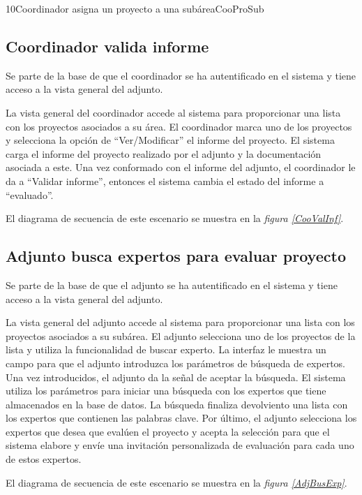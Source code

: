 \documentclass[11pt,a4paper,spanish,twoside]{book}
\begin{document}
{10}{Coordinador asigna un proyecto a una subárea}{CooProSub}

\subsection{Coordinador valida informe}
Se parte de la base de que el coordinador se ha autentificado en el sistema y
tiene acceso a la vista general del adjunto.

La vista general del coordinador accede al sistema para proporcionar una
lista con los proyectos asociados a su área. El coordinador marca uno
de los proyectos y selecciona la opción de ``Ver/Modificar'' el informe del
proyecto. El sistema carga el informe del proyecto realizado por el adjunto
y la documentación asociada a este. Una vez conformado con el informe del
adjunto, el coordinador le da a ``Validar informe'', entonces el sistema
cambia el estado del informe a ``evaluado''.

El diagrama de secuencia de este escenario se muestra en la \emph{figura
\ref{CooValInf}}.


\subsection{Adjunto busca expertos para evaluar proyecto}
Se parte de la base de que el adjunto se ha autentificado en el sistema y
tiene acceso a la vista general del adjunto.

La vista general del adjunto accede al sistema para proporcionar una lista
con los proyectos asociados a su subárea. El adjunto selecciona uno de los
proyectos de la lista y utiliza la funcionalidad de buscar experto. La 
interfaz le muestra un campo para que el adjunto introduzca los parámetros de
búsqueda de expertos. Una vez introducidos, el adjunto da la señal de
aceptar la búsqueda. El sistema utiliza los parámetros para iniciar una 
búsqueda con los expertos que tiene almacenados en la base de datos. La
búsqueda finaliza devolviento una lista con los expertos que contienen las
palabras clave. Por último, el adjunto selecciona los expertos que desea que
evalúen el proyecto y acepta la selección para que el sistema elabore y
envíe una invitación personalizada de evaluación para cada uno de estos
expertos.

El diagrama de secuencia de este escenario se muestra en la \emph{figura
\ref{AdjBusExp}}.
\end{document}
